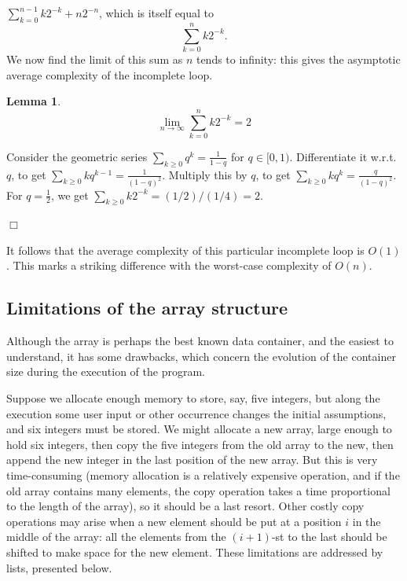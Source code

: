 \documentclass[a4paper]{book}
\theoremstyle{changebreak}                %
\newtheorem{lem}[result]{Lemma}
\newenvironment{proof}
 {{\sl Proof.}\hspace*{1 ex}}%
 {{\nopagebreak\hspace*{\fill}$\Box$\par\vspace{12pt}}}
\begin{document}
$\sum\limits_{k=0}^{n-1} k2^{-k} + n2^{-n}$, which is itself equal to
\begin{equation*}
  \sum_{k=0}^n k2^{-k}.
\end{equation*}
We now find the limit of this sum as $n$ tends to infinity: this gives
the asymptotic average complexity of the
incomplete loop.
\begin{lem}
$$\lim\limits_{n\to\infty} \sum\limits_{k=0}^n k2^{-k}=2$$
\end{lem}
\begin{proof}
Consider the geometric series $\sum_{k\ge 0} q^{k}=\frac{1}{1-q}$ for
$q\in[0,1)$. Differentiate it w.r.t.~$q$, to get $\sum_{k\ge 0}
  kq^{k-1}=\frac{1}{(1-q)^2}$. Multiply this by $q$, to get
  $\sum_{k\ge 0} kq^k=\frac{q}{(1-q)^2}$. For $q=\frac{1}{2}$, we get
  $\sum_{k\ge 0} k2^{-k}=(1/2)/(1/4)=2$.
\end{proof}
It follows that the average complexity of this particular incomplete
loop is $O(1)$. This marks a striking difference with the worst-case
complexity of $O(n)$. 

\subsection{Limitations of the array structure}
Although the array is perhaps the best known data
container, and the easiest to understand, it has
some drawbacks, which concern the evolution of the container
size during the
execution of the program.

Suppose we allocate enough memory to store, say, five
integers, but along the execution some user input or
other occurrence changes the initial assumptions, and six integers
must be stored. We might allocate a new array, large enough to hold
six integers, then copy the five integers from the old array to the
new, then append the new integer in the last position of the new
array. But this is very time-consuming (memory allocation is a
relatively expensive operation, and if the old array contains many
elements, the copy operation takes a time proportional to the length
of the array), so it should be a last resort. Other costly copy
operations may arise when a new element
should be put at a position $i$ in the middle of the array: all the
elements from the $(i+1)$-st to the last should be shifted to make
space for the new element. These limitations are addressed by lists,
presented below.
\end{document}

